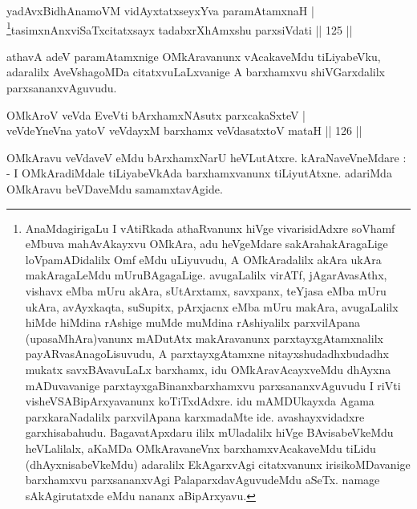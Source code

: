 \begin{shl}
yadAvx\s BidhAnamoVM vidAyxtatxseyxYva paramAtamxnaH  | \\
\footnote{AnaMdagirigaLu I vAtiRkada athaRvanunx hiVge vivarisidAdxre \mdash  soV\s hamf eMbuva mahAvAkayxvu OMkAra, adu heVgeMdare sakArahakAragaLige loVpamADidalilx Omf eMdu uLiyuvudu, A OMkAradalilx akAra ukAra makAragaLeMdu mUruBAgagaLige. avugaLalilx virATf, jAgarAvasAthx, vishavx eMba mUru akAra, sUtArxtamx, savxpanx, teYjasa eMba mUru ukAra, avAyxkaqta, suSupitx, pArxjacnx eMba mUru makAra, avugaLalilx hiMde hiMdina rAshige muMde muMdina rAshiyalilx parxvilApana (upasaMhAra)vanunx mADutAtx makAravanunx parxtayxgAtamxnalilx payARvasAnagoLisuvudu, A parxtayxgAtamxne nitayxshudadhxbudadhx mukatx savxBAvavuLaLx barxhamx, idu OMkAravAcayxveMdu dhAyxna mADuvavanige parxtayxgaBinanxbarxhamxvu parxsananxvAguvudu \mdash  I riVti visheVSABipArxyavanunx koTiTxdAdxre. idu mAMDUkayxda Agama parxkaraNadalilx parxvilApana karxmadaMte ide. avashayxvidadxre garxhisabahudu. BagavatApxdaru ililx mUladalilx hiVge BAvisabeVkeMdu heVLalilalx, aKaMDa OMkAravaneVnx barxhamxvAcakaveMdu tiLidu (dhAyxnisabeVkeMdu) adaralilx EkAgarxvAgi citatxvanunx irisikoMDavanige barxhamxvu parxsananxvAgi PalaparxdavAguvudeMdu aSeTx. namage sAkAgirutatxde eMdu nananx aBipArxyavu.}tasimxnAnxviSaTxcitatxsayx tadabxrXhAmx\s \s shu parxsiVdati \hfill||  125 ||  
\end{shl}

\begin{artha}
athavA adeV paramAtamxnige OMkAravanunx vAcakaveMdu tiLiyabeVku, adaralilx AveVshagoMDa citatxvuLaLxvanige A barxhamxvu shiVGarxdalilx parxsananxvAguvudu.
\end{artha}



\begin{shl}
OMkAroV veVda EveVti bArxhamxNAsutx parxcakaSxteV  | \\
veVdeYneVna yatoV veVdayxM barxhamx veVdasatxtoV mataH \hfill||  126 ||  
\end{shl}

\begin{artha}
OMkAravu veVdaveV eMdu bArxhamxNarU heVLutAtxre. kAraNaveVneMdare : - I OMkAradiMdale tiLiyabeVkAda barxhamxvanunx tiLiyutAtxne. adariMda OMkAravu beVDaveMdu samamxtavAgide.
\end{artha}

